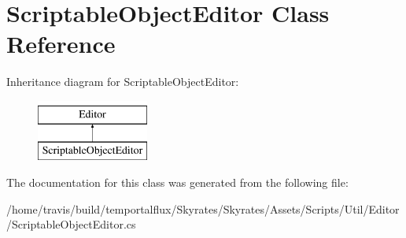 \hypertarget{class_scriptable_object_editor}{\section{Scriptable\-Object\-Editor Class Reference}
\label{class_scriptable_object_editor}
}
Inheritance diagram for Scriptable\-Object\-Editor\-:\begin{figure}[H]
\begin{center}
\leavevmode
\includegraphics[height=2.000000cm]{class_scriptable_object_editor}
\end{center}
\end{figure}


The documentation for this class was generated from the following file\-:\begin{DoxyCompactItemize}
\item 
/home/travis/build/temportalflux/\-Skyrates/\-Skyrates/\-Assets/\-Scripts/\-Util/\-Editor/Scriptable\-Object\-Editor.\-cs\end{DoxyCompactItemize}
